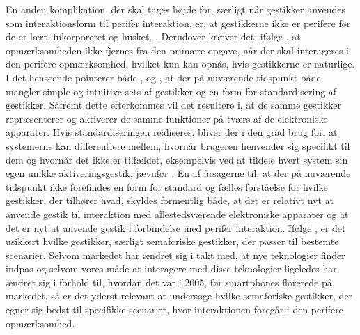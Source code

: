 En anden komplikation, der skal tages højde for, særligt når gestikker anvendes som interaktionsform til perifer interaktion, er, at gestikkerne ikke er perifere før de er lært, inkorporeret og husket, \parencite[s. 16]{PDF:PIEmbeddingHCIOnTheRelevance}. Derudover kræver det, ifølge \textcite[s. 16]{PDF:PIEmbeddingHCIOnTheRelevance}, at opmærksomheden ikke fjernes fra den primære opgave, når der skal interageres i den perifere opmærksomhed, hvilket kun kan opnås, hvis gestikkerne er naturlige. I det henseende pointerer både \textcite[s. 8]{PDF:NaturalUserInterfaces}, \textcite[s. 26]{PDF:ATaxonomyOfGestures} og \textcite[s. 19]{PDF:PIEmbeddingHCIOnTheRelevance}, at der på nuværende tidspunkt både mangler simple og intuitive sets af gestikker og en form for standardisering af gestikker. Såfremt dette efterkommes vil det resultere i, at de samme gestikker repræsenterer og aktiverer de samme funktioner på tværs af de elektroniske apparater. Hvis standardiseringen realiseres, bliver der i den grad brug for, at systemerne kan differentiere mellem, hvornår brugeren henvender sig specifikt til dem og hvornår det ikke er tilfældet, eksempelvis ved at tildele hvert system sin egen unikke aktiveringsgestik, jævnfør . En af årsagerne til, at der på nuværende tidspunkt ikke forefindes en form for standard og fælles forståelse for hvilke gestikker, der tilhører hvad, skyldes formentlig både, at det er relativt nyt at anvende gestik til interaktion med allestedsværende elektroniske apparater og at det er nyt at anvende gestik i forbindelse med perifer interaktion. Ifølge \textcite[s. 28]{PDF:ATaxonomyOfGestures}, er det usikkert hvilke gestikker, særligt semaforiske gestikker, der passer til bestemte scenarier. Selvom markedet har ændret sig i takt med, at nye teknologier finder indpas og selvom vores måde at interagere med disse teknologier ligeledes har ændret sig i forhold til, hvordan det var i 2005, før smartphones florerede på markedet, så er det yderst relevant at undersøge hvilke semaforiske gestikker, der egner sig bedst til specifikke scenarier, hvor interaktionen foregår i den perifere opmærksomhed.


